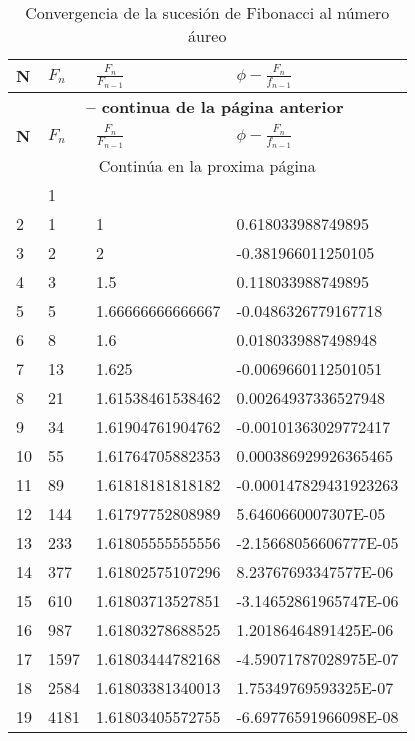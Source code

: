 \documentclass[a4paper]{book}
\begin{document}
\begin{longtable}{llll}
	\caption{Convergencia de la sucesión de Fibonacci al número áureo }
	\label{tab:w1wwwww}\\
	\toprule
	\textbf{N} & \textbf{$F_n$} & \textbf{$\frac{F_n}{F_{n-1}}$}&\textbf{$\phi-\frac{F_n}{f_{n-1}}$}\\\midrule
	\endfirsthead %
 \multicolumn{4}{c}{{\bfseries \tablename\ \thetable{} -- continua de la página anterior}} \\
	\toprule
	\textbf{N} & \textbf{$F_n$} & \textbf{$\frac{F_n}{F_{n-1}}$}&\textbf{$\phi-\frac{F_n}{f_{n-1}}$}\\\midrule
	\endhead
	\midrule\multicolumn{4}{c}{{Continúa en la proxima página}} \\\midrule
	\endfoot
	\bottomrule
	\endlastfoot
1	&	1	&		&		\\
2	&	1	&	1	&	0.618033988749895	\\
3	&	2	&	2	&	-0.381966011250105	\\
4	&	3	&	1.5	&	0.118033988749895	\\
5	&	5	&	1.66666666666667	&	-0.0486326779167718	\\
6	&	8	&	1.6	&	0.0180339887498948	\\
7	&	13	&	1.625	&	-0.0069660112501051	\\
8	&	21	&	1.61538461538462	&	0.00264937336527948	\\
9	&	34	&	1.61904761904762	&	-0.00101363029772417	\\
10	&	55	&	1.61764705882353	&	0.000386929926365465	\\
11	&	89	&	1.61818181818182	&	-0.000147829431923263	\\
12	&	144	&	1.61797752808989	&	5.6460660007307E-05	\\
13	&	233	&	1.61805555555556	&	-2.15668056606777E-05	\\
14	&	377	&	1.61802575107296	&	8.23767693347577E-06	\\
15	&	610	&	1.61803713527851	&	-3.14652861965747E-06	\\
16	&	987	&	1.61803278688525	&	1.20186464891425E-06	\\
17	&	1597	&	1.61803444782168	&	-4.59071787028975E-07	\\
18	&	2584	&	1.61803381340013	&	1.75349769593325E-07	\\
19	&	4181	&	1.61803405572755	&	-6.69776591966098E-08	\\

\end{longtable}
\end{document}
